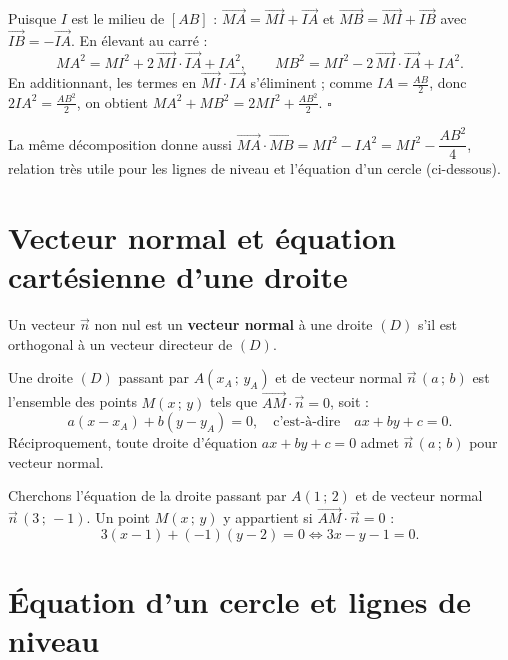 \begin{aretenir}[Démonstration]
Puisque $I$ est le milieu de $[AB]$ : $\vec{MA}=\vec{MI}+\vec{IA}$ et
$\vec{MB}=\vec{MI}+\vec{IB}$ avec $\vec{IB}=-\vec{IA}$. En élevant au carré :
\[ MA^2=MI^2+2\,\vec{MI}\cdot\vec{IA}+IA^2,\qquad
   MB^2=MI^2-2\,\vec{MI}\cdot\vec{IA}+IA^2. \]
En additionnant, les termes en $\vec{MI}\cdot\vec{IA}$ s'éliminent ; comme
$IA=\frac{AB}{2}$, donc $2IA^2=\frac{AB^2}{2}$, on obtient
$MA^2+MB^2=2MI^2+\frac{AB^2}{2}$. \hfill$\square$
\end{aretenir}

\begin{remarque}
La même décomposition donne aussi $\vec{MA}\cdot\vec{MB}=MI^2-IA^2=MI^2-\dfrac{AB^2}{4}$,
relation très utile pour les lignes de niveau et l'équation d'un cercle (ci-dessous).
\end{remarque}

\section{Vecteur normal et équation cartésienne d'une droite}

\begin{definition}
Un vecteur $\vec{n}$ non nul est un \textbf{vecteur normal} à une droite $(D)$ s'il
est orthogonal à un vecteur directeur de $(D)$.
\end{definition}

\begin{theoreme}
Une droite $(D)$ passant par $A(x_A\,;\,y_A)$ et de vecteur normal $\vec{n}\,(a\,;\,b)$
est l'ensemble des points $M(x\,;\,y)$ tels que $\vec{AM}\cdot\vec{n}=0$, soit :
\[ a(x-x_A)+b(y-y_A)=0,\quad\text{c'est-à-dire}\quad ax+by+c=0. \]
Réciproquement, toute droite d'équation $ax+by+c=0$ admet $\vec{n}\,(a\,;\,b)$ pour
vecteur normal.
\end{theoreme}

\begin{exemple}
Cherchons l'équation de la droite passant par $A(1\,;\,2)$ et de vecteur normal
$\vec{n}\,(3\,;\,-1)$. Un point $M(x\,;\,y)$ y appartient si
$\vec{AM}\cdot\vec{n}=0$ :
\[ 3(x-1)+(-1)(y-2)=0\iff 3x-y-1=0. \]
\end{exemple}

\section{Équation d'un cercle et lignes de niveau}

